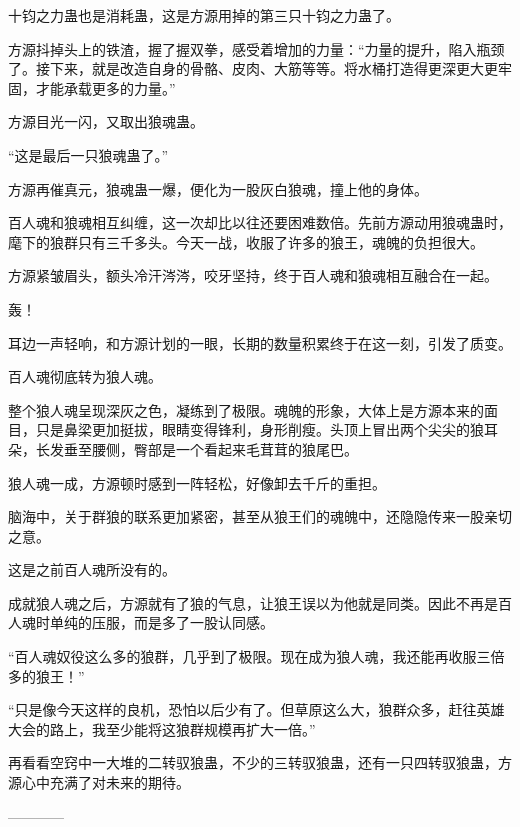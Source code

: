 \begin{this_body}
十钧之力蛊也是消耗蛊，这是方源用掉的第三只十钧之力蛊了。

方源抖掉头上的铁渣，握了握双拳，感受着增加的力量：“力量的提升，陷入瓶颈了。接下来，就是改造自身的骨骼、皮肉、大筋等等。将水桶打造得更深更大更牢固，才能承载更多的力量。”

方源目光一闪，又取出狼魂蛊。

“这是最后一只狼魂蛊了。”

方源再催真元，狼魂蛊一爆，便化为一股灰白狼魂，撞上他的身体。

百人魂和狼魂相互纠缠，这一次却比以往还要困难数倍。先前方源动用狼魂蛊时，麾下的狼群只有三千多头。今天一战，收服了许多的狼王，魂魄的负担很大。

方源紧皱眉头，额头冷汗涔涔，咬牙坚持，终于百人魂和狼魂相互融合在一起。

轰！

耳边一声轻响，和方源计划的一眼，长期的数量积累终于在这一刻，引发了质变。

百人魂彻底转为狼人魂。

整个狼人魂呈现深灰之色，凝练到了极限。魂魄的形象，大体上是方源本来的面目，只是鼻梁更加挺拔，眼睛变得锋利，身形削瘦。头顶上冒出两个尖尖的狼耳朵，长发垂至腰侧，臀部是一个看起来毛茸茸的狼尾巴。

狼人魂一成，方源顿时感到一阵轻松，好像卸去千斤的重担。

脑海中，关于群狼的联系更加紧密，甚至从狼王们的魂魄中，还隐隐传来一股亲切之意。

这是之前百人魂所没有的。

成就狼人魂之后，方源就有了狼的气息，让狼王误以为他就是同类。因此不再是百人魂时单纯的压服，而是多了一股认同感。

“百人魂奴役这么多的狼群，几乎到了极限。现在成为狼人魂，我还能再收服三倍多的狼王！”

“只是像今天这样的良机，恐怕以后少有了。但草原这么大，狼群众多，赶往英雄大会的路上，我至少能将这狼群规模再扩大一倍。”

再看看空窍中一大堆的二转驭狼蛊，不少的三转驭狼蛊，还有一只四转驭狼蛊，方源心中充满了对未来的期待。

------------

\end{this_body}

